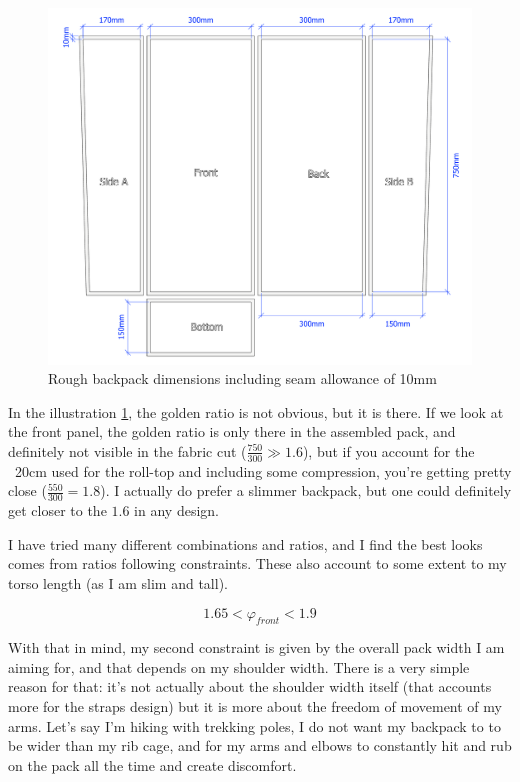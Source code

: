 \begin{figure}[H]
  \includegraphics[width=\textwidth]{media/sketches/pack-rough-cut.pdf}
  \caption{Rough backpack dimensions including seam allowance of 10mm}
  \label{img:pack-rough-cut-2D}
\end{figure}

In the illustration \ref{img:pack-rough-cut-2D}, the golden ratio is not obvious, but it is there. If we look at the front panel, the golden ratio is only there in the assembled pack, and definitely not visible in the fabric cut ($\frac{750}{300} \gg 1.6$), but if you account for the ~20cm used for the roll-top and including some compression, you're getting pretty close ($\frac{550}{300} = 1.8$). I actually do prefer a slimmer backpack, but one could definitely get closer to the $1.6$ in any design.

I have tried many different combinations and ratios, and I find the best looks comes from ratios following constraints. These also account to some extent to my torso length (as I am slim and tall).

\begin{equation}
  1.65 < \varphi_{front} < 1.9
\end{equation}

With that in mind, my second constraint is given by the overall pack width I am aiming for, and that depends on my shoulder width. There is a very simple reason for that: it's not actually about the shoulder width itself (that accounts more for the straps design) but it is more about the freedom of movement of my arms. Let's say I'm hiking with trekking poles, I do not want my backpack to to be wider than my rib cage, and for my arms and elbows to constantly hit and rub on the pack all the time and create discomfort.


